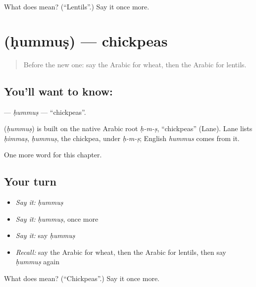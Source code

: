 \begin{tcolorbox}[breakable,colback=teal!4,colframe=teal!35!black,title={Before you move on}]
What does  mean? (\textquotedblleft{}Lentils\textquotedblright{}.) Say it once more.
\end{tcolorbox}
\section[\texorpdfstring{\ar{حمص} (ḥummuṣ)}{حمص (ḥummuṣ)}]{ (ḥummuṣ) — chickpeas}

\label{lesson:AR-C128-hummus}



\begin{quote}
Before the new one: say the Arabic for wheat, then the Arabic for lentils.
\end{quote}

\subsection*{You'll want to know: }
\textbf{} — \emph{ḥummuṣ} — \textquotedblleft{}chickpeas\textquotedblright{}.

\begin{cousinweb}
\textbf{} (\emph{ḥummuṣ}) is built on the native Arabic root \emph{ḥ-m-ṣ}, \textquotedblleft{}chickpeas\textquotedblright{} (Lane). Lane lists \emph{ḥimmaṣ}, \emph{ḥummuṣ}, the chickpea, under \emph{ḥ-m-ṣ}; English \emph{hummus} comes from it.
\end{cousinweb}

\begin{grammarlens}[title={What you've built}]
One more word for this chapter.
\end{grammarlens}

\subsection*{Your turn}
\begin{itemize}
\raggedright
  \item \emph{Say it:} \emph{ḥummuṣ}
  \item \emph{Say it:} \emph{ḥummuṣ}, once more
  \item \emph{Say it:} say \emph{ḥummuṣ}
  \item \emph{Recall:} say the Arabic for wheat, then the Arabic for lentils, then say \emph{ḥummuṣ} again
\end{itemize}

\begin{tcolorbox}[breakable,colback=teal!4,colframe=teal!35!black,title={Before you move on}]
What does  mean? (\textquotedblleft{}Chickpeas\textquotedblright{}.) Say it once more.
\end{tcolorbox}
